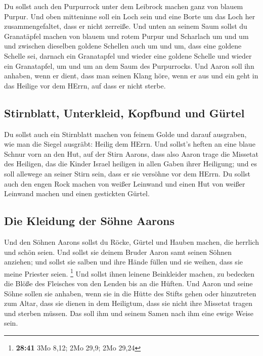  Du sollst auch den Purpurrock unter dem Leibrock machen
ganz von blauem Purpur.  Und oben mitteninne soll ein
Loch sein und eine Borte um das Loch her zusammengefaltet, dass er nicht
zerreiße.  Und unten an seinem Saum sollst du Granatäpfel
machen von blauem und rotem Purpur und Scharlach um und um und zwischen
dieselben goldene Schellen auch um und um,  dass eine
goldene Schelle sei, darnach ein Granatapfel und wieder eine goldene
Schelle und wieder ein Granatapfel, um und um an dem Saum des
Purpurrocks.  Und Aaron soll ihn anhaben, wenn er dient,
dass man seinen Klang höre, wenn er aus und ein geht in das Heilige vor
dem HErrn, auf dass er nicht sterbe.

\hypertarget{stirnblatt-unterkleid-kopfbund-und-guxfcrtel}{%
\subsection{Stirnblatt, Unterkleid, Kopfbund und
Gürtel}\label{stirnblatt-unterkleid-kopfbund-und-guxfcrtel}}

 Du sollst auch ein Stirnblatt machen von feinem Golde
und darauf ausgraben, wie man die Siegel ausgräbt: Heilig dem HErrn.
 Und sollst's heften an eine blaue Schnur vorn an den
Hut,  auf der Stirn Aarons, dass also Aaron trage die
Missetat des Heiligen, das die Kinder Israel heiligen in allen Gaben
ihrer Heiligung; und es soll allewege an seiner Stirn sein, dass er sie
versöhne vor dem HErrn.  Du sollst auch den engen Rock
machen von weißer Leinwand und einen Hut von weißer Leinwand machen und
einen gestickten Gürtel.

\hypertarget{die-kleidung-der-suxf6hne-aarons}{%
\subsection{Die Kleidung der Söhne
Aarons}\label{die-kleidung-der-suxf6hne-aarons}}

 Und den Söhnen Aarons sollst du Röcke, Gürtel und Hauben
machen, die herrlich und schön seien.  Und sollst sie
deinem Bruder Aaron samt seinen Söhnen anziehen; und sollst sie salben
und ihre Hände füllen und sie weihen, dass sie meine Priester seien.
\footnote{\textbf{28:41} 3Mo 8,12; 2Mo 29,9; 2Mo 29,24} 
Und sollst ihnen leinene Beinkleider machen, zu bedecken die Blöße des
Fleisches von den Lenden bis an die Hüften.  Und Aaron
und seine Söhne sollen sie anhaben, wenn sie in die Hütte des Stifts
gehen oder hinzutreten zum Altar, dass sie dienen in dem Heiligtum, dass
sie nicht ihre Missetat tragen und sterben müssen. Das soll ihm und
seinem Samen nach ihm eine ewige Weise sein.

